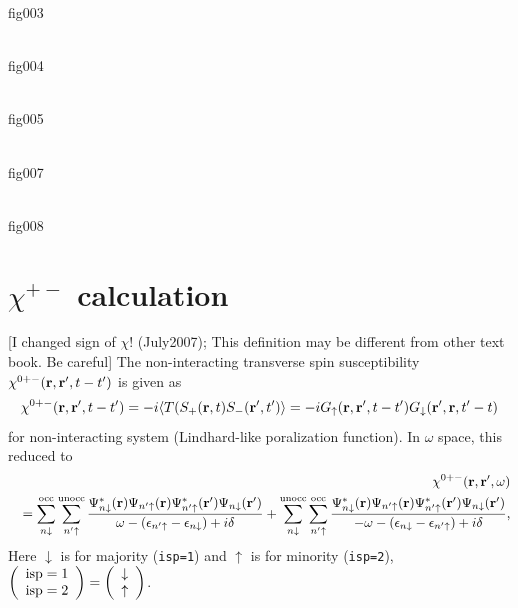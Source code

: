 \documentclass[a4paper,10pt,epsf,fleqn]{article}
\newcommand{\bfr}{{\bf r}}
\newcommand{\figp}[1]{\rotatebox{-90}{\texttt{[image: \#1]}}}
\newcommand{\ispone}{\downarrow}
\newcommand{\isptwo}{\uparrow}
\begin{document}
{{{fig003


\figp{gas_fig004.eps}\\
fig004

\figp{gas_fig005.eps}\\
fig005

\figp{gas_fig007.eps}\\
fig007

\figp{gas_fig008.eps}\\
fig008
 


\newpage

\section{$\chi^{+-}$ calculation} 
\label{chipmcal}
[I changed sign of $\chi$! (July2007); This definition may be different from other text book. Be careful]
The non-interacting transverse spin susceptibility 
$\chi^{0+-}(\bfr,\bfr',t-t')$ is given as
\begin{eqnarray}
\chi^{0+-}(\bfr,\bfr',t-t') = 
-i\langle T(S_+(\bfr,t) S_-(\bfr',t') \rangle
=- i G_\isptwo(\bfr,\bfr',t-t') G_\ispone(\bfr',\bfr,t'-t) 
\label{generalchi0t}
\end{eqnarray}
for non-interacting system (Lindhard-like poralization function).
In $\omega$ space, this reduced to
\begin{eqnarray}
&&\chi^{0+-}(\bfr,\bfr',\omega) \nonumber \\
&&= 
\sum^{\rm  occ}_{n \ispone} \sum^{\rm  unocc}_{n'\isptwo}
\frac{
\Psi_{n\ispone}^*(\bfr)      \Psi_{n'\isptwo}(\bfr)
\Psi_{n'\isptwo}^*(\bfr') \Psi_{n\ispone}(\bfr') 
}{\omega-(\epsilon_{n'\isptwo}-\epsilon_{n\ispone})+i \delta} 
+ \sum^{\rm  unocc}_{n \ispone} \sum^{\rm occ}_{n'\isptwo}
\frac{
\Psi_{n\ispone}^*(\bfr)      \Psi_{n'\isptwo}(\bfr)
\Psi_{n'\isptwo}^*(\bfr') \Psi_{n\ispone}(\bfr') 
}{-\omega-(\epsilon_{n\ispone}-\epsilon_{n'\isptwo})+i \delta},
\label{generalchi0}
\end{eqnarray}
Here $\ispone$ is for majority ({\tt isp=1}) and 
$\isptwo$ is for minority ({\tt isp=2}), 
$\left(
 \begin{array}{c} {\rm isp=1} \\ 
                  {\rm isp=2} 
  \end{array}   
\right) =
\left(
 \begin{array}{c} \ispone \\ 
                 \isptwo 
  \end{array}   
\right)$. \\
   
}}}
\end{document}
